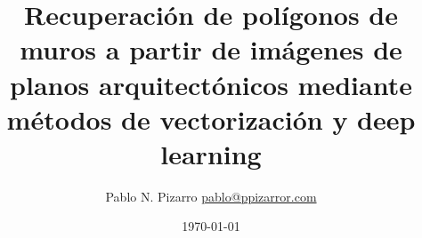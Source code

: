 \documentclass[
	final,
	hyperref={pdfencoding=auto,psdextra},
	xcolor={dvipsnames,table,usenames}
]{beamer}
\title{Recuperación de polígonos de muros a partir de imágenes de planos arquitectónicos mediante métodos de vectorización y deep learning}
\author{Pablo N. Pizarro \small{\href{mailto:pablo@ppizarror.com}{pablo@ppizarror.com}}}
\institute[shortinst]{Universidad de Chile -- Departamento de Ciencias de la Computación}
\date[\today]{\footnotesize{\today}}
\begin{document}
\templatePagecfg

\templateFinalcfg



\end{document}
